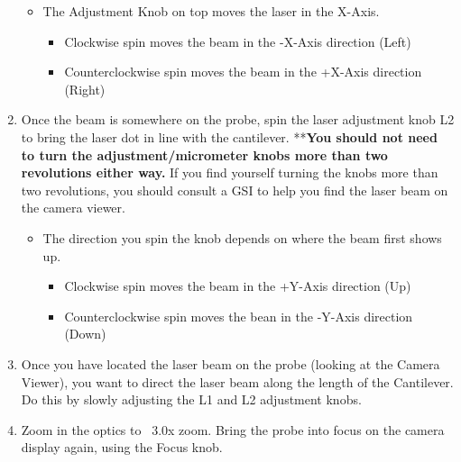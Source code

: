 \documentclass{../lab}
\begin{document}
\begin{enumerate}
    \begin{itemize}
        \item The Adjustment Knob on top moves the laser in the X-Axis.

        \begin{itemize}
            \item Clockwise spin moves the beam in the -X-Axis direction (Left)

            \item Counterclockwise spin moves the beam in the +X-Axis direction (Right)

        \end{itemize}

    \end{itemize}

    \item Once the beam is somewhere on the probe, spin the laser adjustment knob L2 to bring the laser dot in line with the cantilever.  **\textbf{You should not need to turn the adjustment/micrometer knobs more than two revolutions either way.  }If you find yourself turning the knobs more than two revolutions, you should consult a GSI to help you find the laser beam on the camera viewer.

    \begin{itemize}
        \item The direction you spin the knob depends on where the beam first shows up.

        \begin{itemize}
            \item Clockwise spin moves the beam in the +Y-Axis direction (Up)

            \item Counterclockwise spin moves the bean in the -Y-Axis direction (Down)

        \end{itemize}

    \end{itemize}

    \item Once you have located the laser beam on the probe (looking at the Camera Viewer), you want to direct the laser beam along the length of the Cantilever.  Do this by slowly adjusting the L1 and L2 adjustment knobs.

    \item Zoom in the optics to ~3.0x zoom.  Bring the probe into focus on the camera display again, using the Focus knob.


\end{enumerate}
\end{document}
